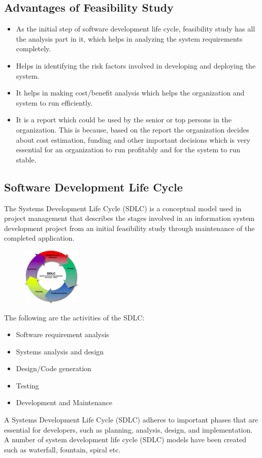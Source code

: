 \documentclass[12pt, a4paper]{report}
\begin{document}
  \subsection*{Advantages of Feasibility Study}
    \begin{itemize}
      \item As the initial step of software development life cycle, feasibility study has all the analysis part in it, which helps in analyzing the system requirements completely. 
      \item Helps in identifying the risk factors involved in developing and deploying the system.
      \item It helps in making cost/benefit analysis which helps the organization and system to run efficiently.
      \item It is a report which could be used by the senior or top persons in the organization. This is because, based on the report the organization decides about cost estimation, funding and other important decisions which is very essential for an organization to run profitably and for the system to run stable.
    \end{itemize}
    
  \subsection*{Software Development Life Cycle}
  The Systems Development Life Cycle (SDLC) is a conceptual model used in project management that describes the stages involved in an information system development project from an initial feasibility study through maintenance of the completed application. \newline
  \begin{figure}
    \includegraphics[width=0.25\textwidth]{feasibility-study}
  \end{figure}
  The following are the activities of the SDLC:
  \begin{itemize}
      \item Software requirement analysis
      \item Systems analysis and design
      \item Design/Code generation
      \item Testing
      \item Development and Maintenance
  \end{itemize}
  A Systems Development Life Cycle (SDLC) adheres to important phases that are essential for developers, such as planning, analysis, design, and implementation. A number of system development life cycle (SDLC) models have been created such as waterfall, fountain, spiral etc.
  
\end{document}
